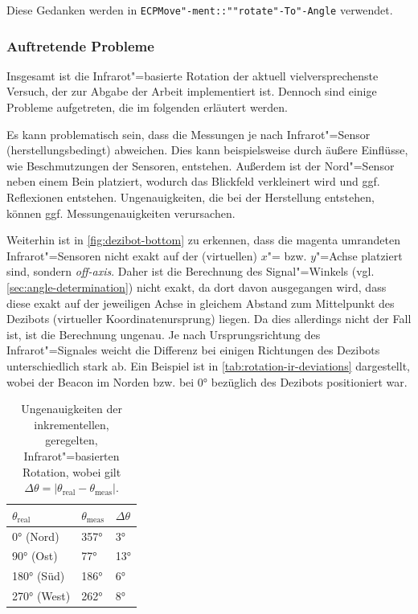 Diese Gedanken werden in \texttt{ECPMove"-ment::""rotate"-To"-Angle} verwendet.


\subsubsection{Auftretende Probleme}

Insgesamt ist die Infrarot"=basierte Rotation der aktuell vielversprechenste Versuch, der zur Abgabe der Arbeit implementiert ist.
Dennoch sind einige Probleme aufgetreten, die im folgenden erläutert werden.


Es kann problematisch sein, dass die Messungen je nach Infrarot"=Sensor (herstellungsbedingt) abweichen. Dies kann beispielsweise durch äußere Einflüsse, wie Beschmutzungen der Sensoren, entstehen. Außerdem ist der Nord"=Sensor neben einem Bein platziert, wodurch das Blickfeld verkleinert wird und ggf. Reflexionen entstehen. Ungenauigkeiten, die bei der Herstellung entstehen, können ggf. Messungenauigkeiten verursachen.


Weiterhin ist in \autoref{fig:dezibot-bottom} zu erkennen, dass die magenta umrandeten Infrarot"=Sensoren nicht exakt auf der (virtuellen) $x$"= bzw. $y$"=Achse platziert sind, sondern \emph{off-axis}. Daher ist die Berechnung des Signal"=Winkels (vgl. \autoref{sec:angle-determination}) nicht exakt, da dort davon ausgegangen wird, dass diese exakt auf der jeweiligen Achse in gleichem Abstand zum Mittelpunkt des Dezibots (virtueller Koordinatenursprung) liegen. Da dies allerdings nicht der Fall ist, ist die Berechnung ungenau. Je nach Ursprungsrichtung des Infrarot"=Signales weicht die Differenz bei einigen Richtungen des Dezibots unterschiedlich stark ab. Ein Beispiel ist in \autoref{tab:rotation-ir-deviations} dargestellt, wobei der Beacon im Norden bzw. bei 0° bezüglich des Dezibots positioniert war.

\begin{table}[h]
\centering
\begin{tabular}{l|l|l}
$\theta_{\text{real}}$ & $\theta_{\text{meas}}$ & $\Delta\theta$ \\ \hline\hline
0° (Nord)              & 357°                   & 3°             \\
90° (Ost)              & 77°                    & 13°            \\
180° (Süd)             & 186°                   & 6°             \\
270° (West)            & 262°                   & 8°                     
\end{tabular}
\caption{Ungenauigkeiten der inkrementellen, geregelten, Infrarot"=basierten Rotation, wobei gilt $\Delta\theta = \vert \theta_{\text{real}} - \theta_{\text{meas}} \vert$.}
\label{tab:rotation-ir-deviations}
\end{table}

